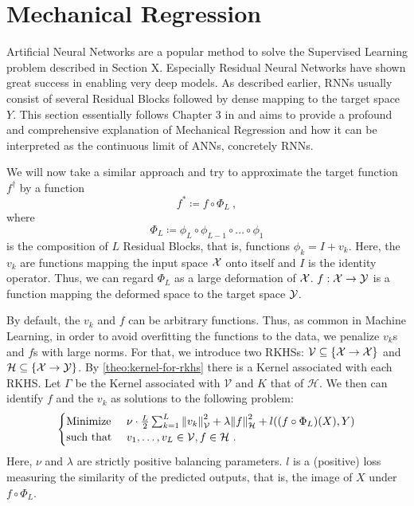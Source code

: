\section{Mechanical Regression}

Artificial Neural Networks are a popular method to solve the Supervised Learning problem described in Section X.
Especially Residual Neural Networks have shown great success in enabling very deep models.
As described earlier, RNNs usually consist of several Residual Blocks followed by dense mapping to the target space $Y$.
This section essentially follows Chapter 3 in \cite{owhadi20} and aims to provide a profound and comprehensive explanation of Mechanical Regression and how it can be interpreted as the continuous limit of ANNs, concretely RNNs.



We will now take a similar approach and try to approximate the target function $f^\dagger$ by a function
\begin{equation}
	f^\ast \coloneqq f \circ \Phi_L \ ,
\end{equation}
where 
\begin{equation}
	\Phi_L \coloneqq \phi_L \circ \phi_{L-1} \circ \ldots \circ \phi_1
\end{equation} 
is the composition of $L$ Residual Blocks, that is, functions $\phi_k = I + v_k$.
Here, the $v_k$ are functions mapping the input space $\mathcal{X}$ onto itself and $I$ is the identity operator.
Thus, we can regard $\Phi_L$ as a large deformation of $\mathcal{X}$.
$f: \mathcal{X} \to \mathcal{Y}$ is a function mapping the deformed space to the target space $\mathcal{Y}$.

By default, the $v_k$ and $f$ can be arbitrary functions.
Thus, as common in Machine Learning, in order to avoid overfitting the functions to the data, we penalize $v_k$s and $f$s with large norms.
For that, we introduce two RKHSs:
$\mathcal{V} \subseteq \{\mathcal{X} \rightarrow \mathcal{X}\}$ and $\mathcal{H} \subseteq \{\mathcal{X} \rightarrow \mathcal{Y}\}$. 
By \autoref{theo:kernel-for-rkhs} there is a Kernel associated with each RKHS.
Let $\Gamma$ be the Kernel associated with $\mathcal{V}$ and $K$ that of $\mathcal{H}$.
We then can identify $f$ and the $v_k$ as solutions to the following problem:
\begin{equation}
	\label{eq:min-v-f}
	\begin{cases}
		\text{Minimize~} & \nu \cdot \frac{L}{2} \sum_{k=1}^{L} \norm{v_k}_\mathcal{V}^2
		+ \lambda \norm{f}_\mathcal{H}^2 
		+ l((f \circ \Phi_L)(X), Y) \\
		\text{such that~} & v_1, \ldots, v_L \in \mathcal{V}, f \in \mathcal{H} \ .
	\end{cases}
\end{equation}
Here, $\nu$ and $\lambda$ are strictly positive balancing parameters.
$l$ is a (positive) loss measuring the similarity of the predicted outputs, that is, the image of $X$ under $f \circ \Phi_L$.

